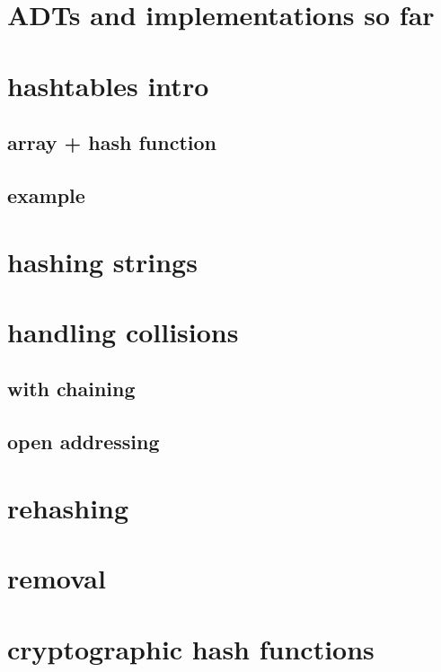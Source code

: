 
\begin{frame}
    \titlepage
\end{frame}

\section{ADTs and implementations so far}



\section{hashtables intro}

\subsection{array + hash function}







\subsection{example}



\section{hashing strings}

\section{handling collisions}

\subsection{with chaining}

\subsection{open addressing}

\section{rehashing}

\section{removal}

\section{cryptographic hash functions}

